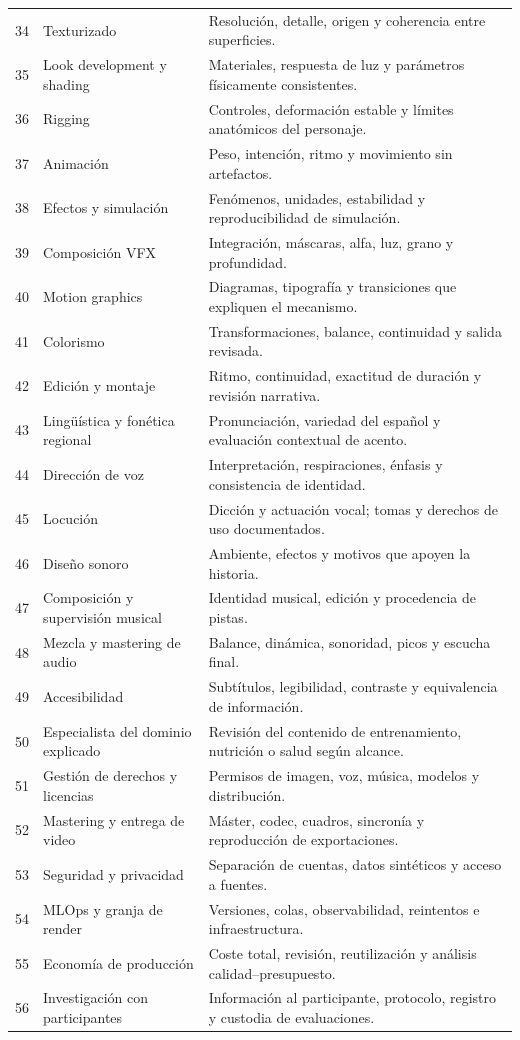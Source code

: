 {\begin{longtable}{p{.05\linewidth}p{.25\linewidth}p{.56\linewidth}}
34 & Texturizado & Resolución, detalle, origen y coherencia entre superficies.\\
35 & Look development y shading & Materiales, respuesta de luz y parámetros físicamente consistentes.\\
36 & Rigging & Controles, deformación estable y límites anatómicos del personaje.\\
37 & Animación & Peso, intención, ritmo y movimiento sin artefactos.\\
38 & Efectos y simulación & Fenómenos, unidades, estabilidad y reproducibilidad de simulación.\\
39 & Composición VFX & Integración, máscaras, alfa, luz, grano y profundidad.\\
40 & Motion graphics & Diagramas, tipografía y transiciones que expliquen el mecanismo.\\
41 & Colorismo & Transformaciones, balance, continuidad y salida revisada.\\
42 & Edición y montaje & Ritmo, continuidad, exactitud de duración y revisión narrativa.\\
43 & Lingüística y fonética regional & Pronunciación, variedad del español y evaluación contextual de acento.\\
44 & Dirección de voz & Interpretación, respiraciones, énfasis y consistencia de identidad.\\
45 & Locución & Dicción y actuación vocal; tomas y derechos de uso documentados.\\
46 & Diseño sonoro & Ambiente, efectos y motivos que apoyen la historia.\\
47 & Composición y supervisión musical & Identidad musical, edición y procedencia de pistas.\\
48 & Mezcla y mastering de audio & Balance, dinámica, sonoridad, picos y escucha final.\\
49 & Accesibilidad & Subtítulos, legibilidad, contraste y equivalencia de información.\\
50 & Especialista del dominio explicado & Revisión del contenido de entrenamiento, nutrición o salud según alcance.\\
51 & Gestión de derechos y licencias & Permisos de imagen, voz, música, modelos y distribución.\\
52 & Mastering y entrega de video & Máster, codec, cuadros, sincronía y reproducción de exportaciones.\\
53 & Seguridad y privacidad & Separación de cuentas, datos sintéticos y acceso a fuentes.\\
54 & MLOps y granja de render & Versiones, colas, observabilidad, reintentos e infraestructura.\\
55 & Economía de producción & Coste total, revisión, reutilización y análisis calidad--presupuesto.\\
56 & Investigación con participantes & Información al participante, protocolo, registro y custodia de evaluaciones.\\\bottomrule
\end{longtable}}

